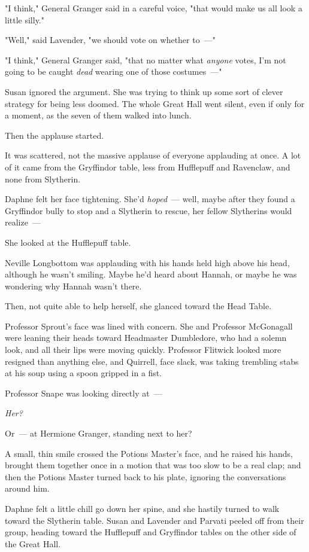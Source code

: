 "I think," General Granger said in a careful voice, "that would make us all
look a little silly."

"Well," said Lavender, "we should vote on whether to~---"

"I think," General Granger said, "that no matter what \emph{anyone} votes, I'm
not going to be caught \emph{dead} wearing one of those costumes~---"

Susan ignored the argument. She was trying to think up some sort of clever
strategy for being less doomed.
\sbreak
The whole Great Hall went silent, even if only for a moment, as the seven of
them walked into lunch.

Then the applause started.

It was scattered, not the massive applause of everyone applauding at once. A
lot of it came from the Gryffindor table, less from Hufflepuff and Ravenclaw,
and none from Slytherin.

Daphne felt her face tightening. She'd \emph{hoped}~--- well, maybe after they
found a Gryffindor bully to stop and a Slytherin to rescue, her fellow
Slytherins would realize~---

She looked at the Hufflepuff table.

Neville Longbottom was applauding with his hands held high above his head,
although he wasn't smiling. Maybe he'd heard about Hannah, or maybe he was
wondering why Hannah wasn't there.

Then, not quite able to help herself, she glanced toward the Head Table.

Professor Sprout's face was lined with concern. She and Professor McGonagall
were leaning their heads toward Headmaster Dumbledore, who had a solemn look,
and all their lips were moving quickly. Professor Flitwick looked more resigned
than anything else, and Quirrell, face slack, was taking trembling stabs at his
soup using a spoon gripped in a fist.

Professor Snape was looking directly at~---

\emph{Her?}

Or~--- at Hermione Granger, standing next to her?

A small, thin smile crossed the Potions Master's face, and he raised his hands,
brought them together once in a motion that was too slow to be a real clap; and
then the Potions Master turned back to his plate, ignoring the conversations
around him.

Daphne felt a little chill go down her spine, and she hastily turned to walk
toward the Slytherin table. Susan and Lavender and Parvati peeled off from
their group, heading toward the Hufflepuff and Gryffindor tables on the other
side of the Great Hall.

